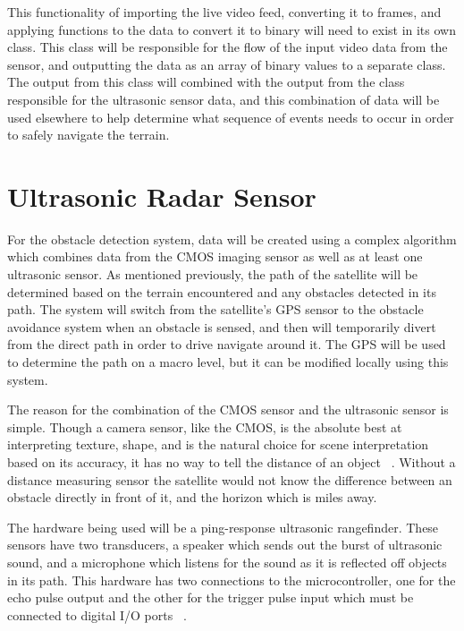 \documentclass[10pt,letterpaper,onecolumn,journal]{IEEEtran}
\begin{document}
\par 
This functionality of importing the live video feed, converting it to frames, and applying functions to the data to convert it to binary will need to exist in its own class. This class will be responsible for the flow of the input video data from the sensor, and outputting the data as an array of binary values to a separate class. The output from this class will combined with the output from the class responsible for the ultrasonic sensor data, and this combination of data will be used elsewhere to help determine what sequence of events needs to occur in order to safely navigate the terrain.
%
%
\section{Ultrasonic Radar Sensor}
For the obstacle detection system, data will be created using a complex algorithm which combines data from the CMOS imaging sensor as well as at least one ultrasonic sensor. As mentioned previously, the path of the satellite will be determined based on the terrain encountered and any obstacles detected in its path. The system will switch from the satellite's GPS sensor to the obstacle avoidance system when an obstacle is sensed, and then will temporarily divert from the direct path in order to drive navigate around it. The GPS will be used to determine the path on a macro level, but it can be modified locally using this system.\vspace{.3cm}
\par
The reason for the combination of the CMOS sensor and the ultrasonic sensor is simple. Though a camera sensor, like the CMOS, is the absolute best at interpreting texture, shape, and is the natural choice for scene interpretation based on its accuracy, it has no way to tell the distance of an object ~\cite{santo2016}. Without a distance measuring sensor the satellite would not know the difference between an obstacle directly in front of it, and the horizon which is miles away.\vspace{.3cm}
\par 
The hardware being used will be a ping-response ultrasonic rangefinder. These sensors have two transducers, a speaker which sends out the burst of ultrasonic sound, and a microphone which listens for the sound as it is reflected off objects in its path. This hardware has two connections to the microcontroller, one for the echo pulse output and the other for the trigger pulse input which must be connected to digital I/O ports ~\cite{2016frc}.\vspace{.3cm}
\end{document}
